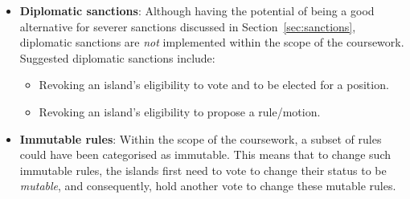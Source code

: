 \begin{itemize}
    \item \textbf{Diplomatic sanctions}: Although having the potential of being a good alternative for severer sanctions discussed in  Section~\ref{sec:sanctions}, diplomatic sanctions are \emph{not} implemented within the scope of the coursework. \\
    Suggested diplomatic sanctions include:
        \begin{itemize}
            \item Revoking an island's eligibility to vote and to be elected for a position.
            \item Revoking an island's eligibility to propose a rule/motion.
        \end{itemize}
    \item \textbf{Immutable rules}: Within the scope of the coursework, a subset of rules could have been categorised as immutable. This means that to change such immutable rules, the islands first need to vote to change their status to be \emph{mutable}, and consequently, hold another vote to change these mutable rules.
\end{itemize}

